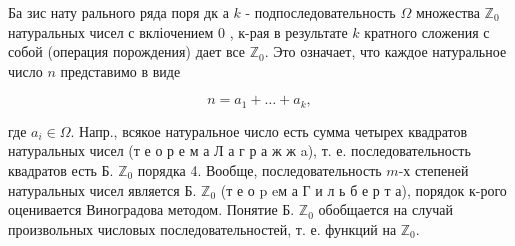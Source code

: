 \documentclass[10pt]{article}
\begin{document}
Ба зис нату рального ряда поря дк а $k$ - подпоследовательность $\Omega$ множества $\mathbb{Z}_{0}$ натуральных чисел с вкліочением 0 , к-рая в результате $k$ кратного сложения с собой (операция порождения) дает все $\mathbb{Z}_{0}$. Это означает, что каждое натуральное число $n$ представимо в виде



\[

n=a_{1}+\ldots+a_{k},

\]



где $a_{i} \in \Omega$. Напр., всякое натуральное число есть сумма четырех квадратов натуральных чисел (т е о р е м а Л а г р а ж ж a), т. е. последовательность квадратов есть Б. $\mathbb{Z}_{0}$ порядка 4. Вообще, последовательность $m$-х степеней натуральных чисел является Б. $\mathbb{Z}_{0}$ (т е о p eм а Г и л ь б е р т а), порядок к-рого оценивается Виноградова методом. Понятие Б. $\mathbb{Z}_{0}$ обобщается на случай произвольных числовых последовательностей, т. е. функций на $\mathbb{Z}_{0}$.
\end{document}
